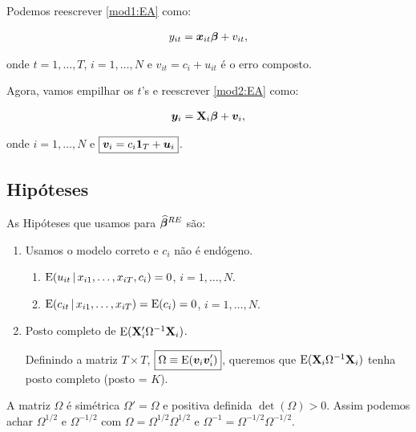 \documentclass[11pt, oneside, a4paper, article]{article}
\numberwithin{equation}{section}
\begin{document}
\begin{description}
Podemos reescrever \eqref{mod1:EA} como:

\vspace{-1 em}
\begin{align} \label{mod2:EA}
	y_{it} = \boldsymbol{x}_{it} \boldsymbol{\beta} + v_{it},
\end{align}

\noindent
onde
$t = 1, \dots, T$, $i = 1, \dots, N$ e $\boxed{v_{it} = c_{i} + u_{it}}$ é o erro composto.

Agora, vamos empilhar os $t$'s e reescrever \eqref{mod2:EA} como:

\vspace{-1 em}
\begin{align} \label{mod3:EA}
	\boldsymbol{y}_{i} = \mathbf{X}_{i} \boldsymbol{\beta} + \boldsymbol{v}_{i},
\end{align}

\noindent
onde
$i = 1, \dots, N$ e $\boxed{\boldsymbol{v}_{i} = c_{i} \boldsymbol{1}_{T} + \boldsymbol{u}_{i}}$.

\subsection{Hipóteses}

As Hipóteses que usamos para $\boldsymbol{\widehat{\beta}}^{RE}$ são:

\begin{enumerate} \itemsep0pt
\item  
Usamos o modelo correto e $c_{i}$ não é endógeno.

\begin{enumerate}[label =\alph*)]
\item 
	$\text{E}( u_{it} \, | \,  x_{i1}, \dots, x_{iT}, c_{i} ) = 0$,
	$i = 1, \dots, N$.
\item        
	$\text{E}( c_{it} \, | \, x_{i1}, \dots, x_{iT} ) = \text{E}( c_{i} ) = 0$,
	$i = 1, \dots, N$.
\end{enumerate}

\item  Posto completo de $\text{E}( \mathbf{X}_{i}' \Omega^{-1} \mathbf{X}_{i} )$.

Definindo a matriz $T \times T$, $\boxed{\Omega \equiv \text{E}(\boldsymbol{v}_{i} \boldsymbol{v}_{i}')}$, queremos que $\text{E}( \mathbf{X}_{i} \Omega^{-1} \mathbf{X}_{i} )$ tenha posto completo (posto = $K$).
\end{enumerate}

A matriz $\Omega$ é simétrica $\Omega' = \Omega$ e positiva definida $\det(\Omega) > 0$.
Assim podemos achar $\Omega^{1/2}$ e $\Omega^{-1/2}$ com $\Omega = \Omega^{1/2} \Omega^{1/2}$ e $\Omega^{-1} = \Omega^{-1/2} \Omega^{-1/2}$.


\end{description}
\end{document}
